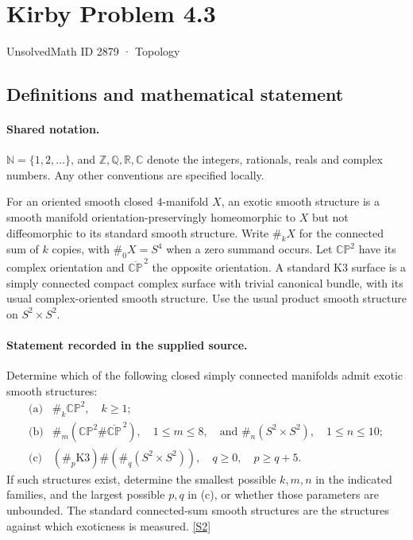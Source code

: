 \documentclass[11pt]{article}
\newcommand{\sref}[2]{\hyperlink{source:#1:#2}{[S#2]}}
\begin{document}
\setcounter{section}{2878}
\section{Kirby Problem 4.3}\label{2879}
{\small\sffamily UnsolvedMath ID 2879 · Topology}
\subsection{Definitions and mathematical statement}

\paragraph{Shared notation.}$\mathbb N=\{1,2,\ldots\}$, and $\mathbb Z,\mathbb Q,\mathbb R,\mathbb C$ denote the integers, rationals, reals and complex numbers. Any other conventions are specified locally.


For an oriented smooth closed $4$-manifold $X$, an exotic smooth structure is a smooth manifold orientation-preservingly homeomorphic to $X$ but not diffeomorphic to its standard smooth structure. Write $\#_kX$ for the connected sum of $k$ copies, with $\#_0X=S^4$ when a zero summand occurs. Let $\mathbb{CP}^2$ have its complex orientation and $\overline{\mathbb{CP}}^{\,2}$ the opposite orientation. A standard K3 surface is a simply connected compact complex surface with trivial canonical bundle, with its usual complex-oriented smooth structure. Use the usual product smooth structure on $S^2\times S^2$.
\paragraph{Statement recorded in the supplied source.}
Determine which of the following closed simply connected manifolds admit exotic smooth structures:
\[
\begin{array}{ll}
\text{(a)}&\#_k\mathbb{CP}^2,\quad k\ge1;\\[2pt]
\text{(b)}&\#_m(\mathbb{CP}^2\#\overline{\mathbb{CP}}^{\,2}),\quad1\le m\le8,
\quad\text{and }\#_n(S^2\times S^2),\quad1\le n\le10;\\[2pt]
\text{(c)}&(\#_p\mathrm{K3})\#(\#_q(S^2\times S^2)),\quad q\ge0,\quad p\ge q+5.
\end{array}
\]
If such structures exist, determine the smallest possible $k,m,n$ in the indicated families, and the largest possible $p,q$ in (c), or whether those parameters are unbounded. The standard connected-sum smooth structures are the structures against which exoticness is measured. \sref{2879}{2}
\end{document}
